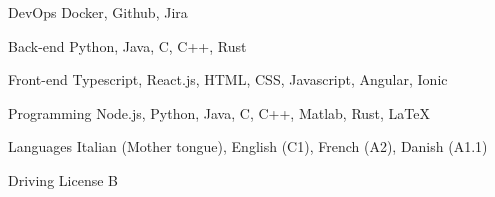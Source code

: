 

\begin{cvskills}


  \cvskill
    {DevOps} %
    {Docker, Github, Jira} %

  \cvskill
    {Back-end} %
    {Python, Java, C, C++, Rust} %

  \cvskill
    {Front-end} %
    {Typescript, React.js, HTML, CSS, Javascript, Angular, Ionic} %

  \cvskill
    {Programming} %
    {Node.js, Python, Java, C, C++, Matlab, Rust, LaTeX} %

  \cvskill
    {Languages} %
    {Italian (Mother tongue), English (C1), French (A2), Danish (A1.1)} %

  \cvskill
    {Driving License} %
    {B} %

\end{cvskills}
